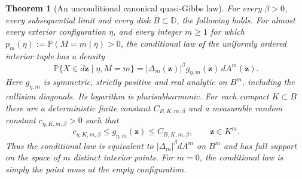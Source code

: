 \documentclass[11pt,a4paper]{article}
\numberwithin{equation}{section}
\newtheorem{theorem}{Theorem}[section]
\theoremstyle{definition}
\theoremstyle{remark}
\newcommand{\D}{\mathbb D}
\begin{document}
\begin{theorem}[An unconditional canonical quasi-Gibbs law]
\label{thm:unconditional-canonical-quasigibbs}
For every $\beta>0$, every subsequential limit and every disk
$\overline B\subset\D$, the following holds. For almost every exterior
configuration $\eta$, and every integer $m\ge1$ for which
$p_m(\eta):=\mathbb P(M=m\mid\eta)>0$, the conditional law of the
uniformly ordered interior tuple has a density
\begin{equation}\label{eq:unmarked-canonical-quasigibbs}
 \mathbb P\{X\in d\mathbf z\mid\eta,M=m\}
   =|\Delta_m(\mathbf z)|^\beta
                   g_{\eta,m}(\mathbf z)\,dA^m(\mathbf z).
\end{equation}
Here $g_{\eta,m}$ is symmetric, strictly positive and real analytic on
$B^m$, including the collision diagonals. Its logarithm is
plurisubharmonic. For each compact $K\subset B$ there are a
deterministic finite constant $C_{B,K,m,\beta}$ and a measurable random
constant $c_{\eta,K,m,\beta}>0$ such that
\begin{equation}\label{eq:canonical-quasigibbs-two-sided}
 c_{\eta,K,m,\beta}\le g_{\eta,m}(\mathbf z)
                   \le C_{B,K,m,\beta},\qquad \mathbf z\in K^m.
\end{equation}
Thus the conditional law is equivalent to
$|\Delta_m|^\beta dA^m$ on $B^m$ and has full support on the
space of $m$ distinct interior points. For $m=0$, the conditional law
is simply the point mass at the empty configuration.
\end{theorem}
\end{document}
